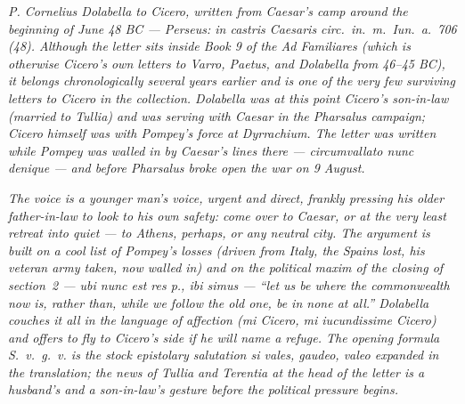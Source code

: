 
\textit{P. Cornelius Dolabella to Cicero, written from
Caesar's camp around the beginning of June 48 BC ---
Perseus: \textit{in castris Caesaris circ.~in.~m.~Iun.~a.~706
(48)}. Although the letter sits inside Book 9 of the Ad
Familiares (which is otherwise Cicero's own letters to
Varro, Paetus, and Dolabella from 46--45 BC), it belongs
chronologically several years earlier and is one of the
very few surviving letters \emph{to} Cicero in the
collection. Dolabella was at this point Cicero's
son-in-law (married to Tullia) and was serving with
Caesar in the Pharsalus campaign; Cicero himself was with
Pompey's force at Dyrrachium. The letter was written
while Pompey was walled in by Caesar's lines there ---
\textit{circumvallato nunc denique} --- and before
Pharsalus broke open the war on 9 August.}

\textit{The voice is a younger man's voice, urgent and
direct, frankly pressing his older father-in-law to look
to his own safety: come over to Caesar, or at the very
least retreat into quiet --- to Athens, perhaps, or any
neutral city. The argument is built on a cool list of
Pompey's losses (driven from Italy, the Spains lost, his
veteran army taken, now walled in) and on the political
maxim of the closing of section~2 --- \textit{ubi nunc est
res p., ibi simus} --- ``let us be where the commonwealth
now is, rather than, while we follow the old one, be in
none at all.'' Dolabella couches it all in the language of
affection (\textit{mi Cicero, mi iucundissime Cicero}) and
offers to fly to Cicero's side if he will name a refuge.
The opening formula \textit{S.~v.~g.~v.} is the stock
epistolary salutation \textit{si vales, gaudeo, valeo}
expanded in the translation; the news of Tullia and
Terentia at the head of the letter is a husband's and a
son-in-law's gesture before the political pressure
begins.}
